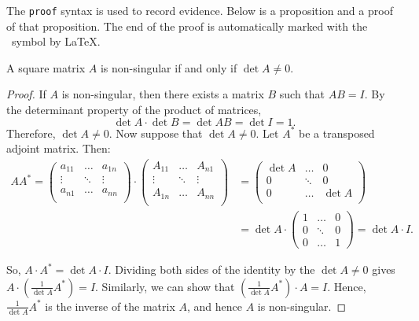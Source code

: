 \documentclass[]{VUMIFTemplateClass}
\begin{document}
\noindent The \texttt{proof} syntax is used to record evidence. Below is a proposition and a proof of that proposition. The end of the proof is automatically marked with the \square\ symbol by \LaTeX.
\begin{proposition}
  A square matrix $A$ is non-singular if and only if $\det A \ne 0$.
\end{proposition}
\begin{proof}
    If $A$ is non-singular, then there exists a matrix $B$ such that $AB=I$. By the determinant property of the product of matrices,
    \[
        \det A \cdot \det B = \det AB = \det I = 1.
    \]
    Therefore, $\det A \ne 0$.
    Now suppose that $\det A \ne 0$. Let $A^*$ be a transposed adjoint matrix. Then:
     \[\begin{split}
        A A^* =
        \begin{pmatrix}
            a_{11} & \dots & a_{1n} \\
            \vdots & \ddots & \vdots \\
            a_{n1} & \dots & a_{nn} \\
        \end{pmatrix} \cdot
        \begin{pmatrix}
            A_{11} & \dots & A_{n1} \\
            \vdots & \ddots & \vdots \\
            A_{1n} & \dots & A_{nn} \\
        \end{pmatrix} 
&=  \begin{pmatrix}
            \det A  & \dots & 0 \\
                  0 & \ddots & 0 \\
                  0 & \dots & \det A \\
        \end{pmatrix}
        \\
        &=\det A \cdot
        \begin{pmatrix}
            1 & \dots & 0\\
            0 & \ddots & 0\\
            0 & \dots & 1
        \end{pmatrix} = \det A \cdot I.
    \end{split}\]

    So, $A \cdot A^* = \det A \cdot I$. Dividing both sides of the identity by the $\det A \ne 0$ gives $A \cdot \left(\frac{1}{\det A}A^*\right) = I$. Similarly, we can show that $\left(\frac{1}{\det A}A^*\right) \cdot A = I$. Hence, $\frac{1}{\det A}A^*$ is the inverse of the matrix $A$, and hence $A$ is non-singular.
    \end{proof}
\end{document}
